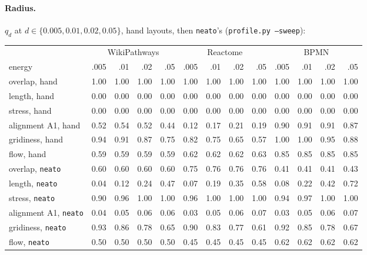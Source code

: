 \documentclass[a4paper,UKenglish]{gd-lipics-v3}
\begin{document}
\paragraph{Radius.} $q_d$ at $d \in \{0.005, 0.01, 0.02, 0.05\}$, hand layouts, then
\texttt{neato}'s (\texttt{profile.py --sweep}):

\begin{center}\footnotesize
\fontsize{6}{7.2}\selectfont\setlength{\tabcolsep}{1.6pt}
\begin{tabular}{lrrrrrrrrrrrr}
\toprule
 & \multicolumn{4}{c}{WikiPathways} & \multicolumn{4}{c}{Reactome} & \multicolumn{4}{c}{BPMN} \\
energy & .005 & .01 & .02 & .05 & .005 & .01 & .02 & .05 & .005 & .01 & .02 & .05 \\
\midrule
overlap, hand & 1.00 & 1.00 & 1.00 & 1.00 & 1.00 & 1.00 & 1.00 & 1.00 & 1.00 & 1.00 & 1.00 & 1.00 \\
length, hand & 0.00 & 0.00 & 0.00 & 0.00 & 0.00 & 0.00 & 0.00 & 0.00 & 0.00 & 0.00 & 0.00 & 0.00 \\
stress, hand & 0.00 & 0.00 & 0.00 & 0.00 & 0.00 & 0.00 & 0.00 & 0.00 & 0.00 & 0.00 & 0.00 & 0.00 \\
alignment A1, hand & 0.52 & 0.54 & 0.52 & 0.44 & 0.12 & 0.17 & 0.21 & 0.19 & 0.90 & 0.91 & 0.91 & 0.87 \\
gridiness, hand & 0.94 & 0.91 & 0.87 & 0.75 & 0.82 & 0.75 & 0.65 & 0.57 & 1.00 & 1.00 & 0.95 & 0.88 \\
flow, hand & 0.59 & 0.59 & 0.59 & 0.59 & 0.62 & 0.62 & 0.62 & 0.63 & 0.85 & 0.85 & 0.85 & 0.85 \\
\midrule
overlap, \texttt{neato} & 0.60 & 0.60 & 0.60 & 0.60 & 0.75 & 0.76 & 0.76 & 0.76 & 0.41 & 0.41 & 0.41 & 0.43 \\
length, \texttt{neato} & 0.04 & 0.12 & 0.24 & 0.47 & 0.07 & 0.19 & 0.35 & 0.58 & 0.08 & 0.22 & 0.42 & 0.72 \\
stress, \texttt{neato} & 0.90 & 0.96 & 1.00 & 1.00 & 0.96 & 1.00 & 1.00 & 1.00 & 0.94 & 0.97 & 1.00 & 1.00 \\
alignment A1, \texttt{neato} & 0.04 & 0.05 & 0.06 & 0.06 & 0.03 & 0.05 & 0.06 & 0.07 & 0.03 & 0.05 & 0.06 & 0.07 \\
gridiness, \texttt{neato} & 0.93 & 0.86 & 0.78 & 0.65 & 0.90 & 0.83 & 0.77 & 0.61 & 0.92 & 0.85 & 0.78 & 0.67 \\
flow, \texttt{neato} & 0.50 & 0.50 & 0.50 & 0.50 & 0.45 & 0.45 & 0.45 & 0.45 & 0.62 & 0.62 & 0.62 & 0.62 \\
\bottomrule
\end{tabular}
\end{center}
\end{document}
